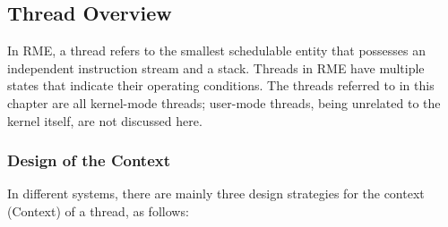 \subsection{Thread Overview}\label{subsec:4-thread-overview}

In RME, a thread refers to the smallest schedulable entity that possesses an independent instruction stream and a stack. Threads in RME have multiple states that indicate their operating conditions. The threads referred to in this chapter are all kernel-mode threads; user-mode threads, being unrelated to the kernel itself, are not discussed here.

\subsubsection{Design of the Context}\label{subsubsec:4-context-design}

In different systems, there are mainly three design strategies for the context (Context) of a thread, as follows:

